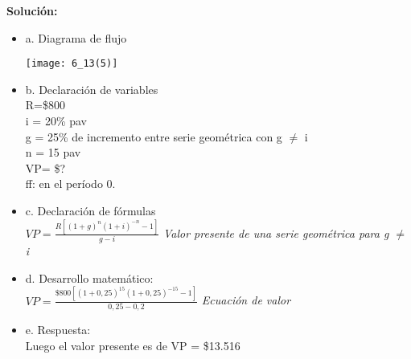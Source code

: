 	\textbf{Solución:}\\
	\begin{itemize}
	    \item a. Diagrama de flujo\\
        \begin{center}
		\texttt{[image: 6\_13(5)]}
	\end{center}	    
		\item b. Declaración de variables\\
		R=\$800 \\ i = 20\% pav \\ g = 25\% de incremento entre serie geométrica con g $\not=$ i \\ n = 15 pav \\ VP= \$? \\ ff: en el período 0.\\
		\item c. Declaración de fórmulas\\
		$VP = \frac{R[(1+g)^n(1+i)^{-n}-1]}{g-i}$ \hspace{35 pt} \textit{Valor presente de una serie geométrica para g $\not=$ i}\\
		\item d. Desarrollo matemático:\\
		$VP = \frac{\$800[(1+0,25)^{15}(1+0,25)^{-15}-1]}{0,25-0,2}$ \hspace{35 pt} \textit{Ecuación de valor}\\
		\item e. Respuesta:\\
		Luego el valor presente es de VP = \$13.516\\
	\end{itemize}
	
